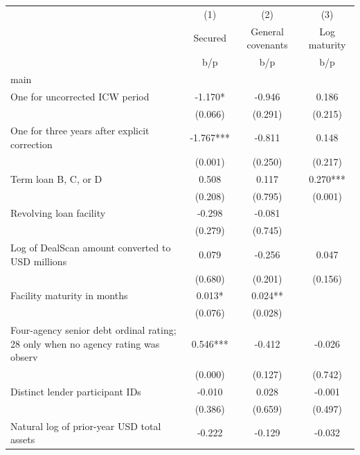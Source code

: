 {
\def\sym#1{\ifmmode^{#1}\else\(^{#1}\)\fi}
\begin{tabular}{l*{3}{c}}
\hline\hline
                    &\multicolumn{1}{c}{(1)}&\multicolumn{1}{c}{(2)}&\multicolumn{1}{c}{(3)}\\
                    &\multicolumn{1}{c}{Secured}&\multicolumn{1}{c}{General covenants}&\multicolumn{1}{c}{Log maturity}\\
                    &         b/p   &         b/p   &         b/p   \\
\hline
main                &               &               &               \\
One for uncorrected ICW period&      -1.170*  &      -0.946   &       0.186   \\
                    &     (0.066)   &     (0.291)   &     (0.215)   \\
One for three years after explicit correction&      -1.767***&      -0.811   &       0.148   \\
                    &     (0.001)   &     (0.250)   &     (0.217)   \\
Term loan B, C, or D&       0.508   &       0.117   &       0.270***\\
                    &     (0.208)   &     (0.795)   &     (0.001)   \\
Revolving loan facility&      -0.298   &      -0.081   &               \\
                    &     (0.279)   &     (0.745)   &               \\
Log of DealScan amount converted to USD millions&       0.079   &      -0.256   &       0.047   \\
                    &     (0.680)   &     (0.201)   &     (0.156)   \\
Facility maturity in months&       0.013*  &       0.024** &               \\
                    &     (0.076)   &     (0.028)   &               \\
Four-agency senior debt ordinal rating; 28 only when no agency rating was observ&       0.546***&      -0.412   &      -0.026   \\
                    &     (0.000)   &     (0.127)   &     (0.742)   \\
Distinct lender participant IDs&      -0.010   &       0.028   &      -0.001   \\
                    &     (0.386)   &     (0.659)   &     (0.497)   \\
Natural log of prior-year USD total assets&      -0.222   &      -0.129   &      -0.032   \\

\end{tabular}}
